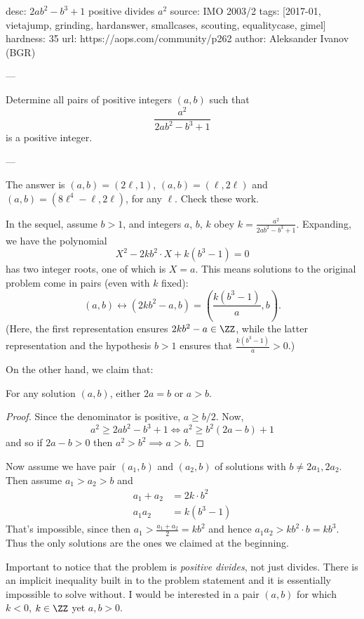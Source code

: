 desc: $2ab^2-b^3+1$ positive divides $a^2$
source: IMO 2003/2
tags: [2017-01, vietajump, grinding, hardanswer, smallcases, scouting, equalitycase, gimel]
hardness: 35
url: https://aops.com/community/p262
author: Aleksander Ivanov (BGR)

---

Determine all pairs of positive integers $(a,b)$ such that
\[ \frac{a^2}{2ab^2-b^3+1} \]
is a positive integer.

---

The answer is $(a,b) = (2\ell, 1)$, $(a,b) = (\ell, 2\ell)$
and $(a,b) = (8\ell^4-\ell, 2\ell)$, for any $\ell$.
Check these work.

In the sequel, assume $b > 1$,
and integers $a$, $b$, $k$ obey $k = \frac{a^2}{2ab^2-b^3+1}$.
Expanding, we have the polynomial
\[ X^2 - 2kb^2 \cdot X + k(b^3-1) = 0 \]
has two integer roots, one of which is $X = a$.
This means solutions to the original problem come in pairs
(even with $k$ fixed):
\[ (a,b) \longleftrightarrow
  \left( 2kb^2 - a, b\right)
  = \left( \frac{k(b^3-1)}{a}, b\right). \]
(Here, the first representation ensures
$2kb^2-a \in \ZZ$,
while the latter representation and the hypothesis $b > 1$ ensures
that $\frac{k(b^3-1)}{a} > 0$.)

On the other hand, we claim that:
\begin{claim*}
For any solution $(a,b)$,
either $2a = b$ or $a > b$.
\end{claim*}
\begin{proof}
  Since the denominator is positive, $a \ge b/2$.
  Now,
  \[ a^2 \ge 2ab^2 - b^3 + 1 \iff a^2 \ge b^2(2a-b) + 1 \]
  and so if $2a - b > 0$ then $a^2 > b^2 \implies a > b$.
\end{proof}

Now assume we have pair $(a_1, b)$ and $(a_2, b)$
of solutions with $b \neq 2a_1, 2a_2$.
Then assume $a_1 > a_2 > b$ and
\begin{align*}
  a_1 + a_2 &= 2k \cdot b^2 \\
  a_1a_2 &= k(b^3-1)
\end{align*}
That's impossible, since then $a_1 > \frac{a_1+a_2}{2} = k b^2$
and hence $a_1a_2 > kb^2 \cdot b = kb^3$.
Thus the only solutions are the ones we claimed at the beginning.

\begin{remark*}
  Important to notice that the problem is \emph{positive divides},
  not just divides.
  There is an implicit inequality built in to the problem
  statement and it is essentially impossible to solve without.
  I would be interested in a pair $(a,b)$
  for which $k < 0$, $k \in \ZZ$ yet $a, b > 0$.
\end{remark*}
